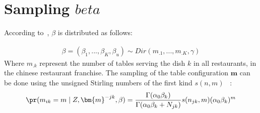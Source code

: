 \section{Sampling $beta$}

According to~\cite{HDP}, $\beta$ is distributed as follows:

\begin{align}
\beta = (\beta_1,...,\beta_K, \beta_u) \sim Dir(m_{\bm{.}1},..., m_{\bm{.}K}, \gamma)
\end{align}
Where $m_{\bm{.}k}$ represent the number of tables serving the dish $k$ in all restaurants, in the chinese restaurant franchise. The sampling of the table configuration $\bm{m}$ can be done using the unsigned Stirling numbers of the first kind $s(n,m)$ ~\cite{antoniak1974mixtures}:
\begin{equation}
    \pr(m_{ik}=m \mid Z, \bm{m}^{-jk}, \beta ) = \frac{\Gamma(\alpha_0 \beta_k)}{\Gamma(\alpha_0 \beta_k + N_{jk})} s(n_{jk}, m) (\alpha_0 \beta_k)^m
 \end{equation}

